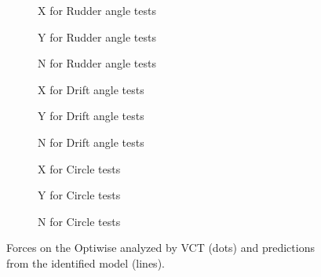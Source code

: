 \begin{figure}[h]
    \centering
    \begin{subfigure}[b]{0.325\textwidth}
         \centering
         
        \caption{X for Rudder angle tests}
        \label{fig:rudder_angle_X_optiwise}
    \end{subfigure}
    \hfill
    \begin{subfigure}[b]{0.325\textwidth}
        \centering
        
       \caption{Y for Rudder angle tests}
       \label{fig:rudder_angle_Y_optiwise}
    \end{subfigure}
    \hfill
    \begin{subfigure}[b]{0.325\textwidth}
        \centering
        
       \caption{N for Rudder angle tests}
       \label{fig:rudder_angle_N_optiwise}
    \end{subfigure}

    \vfill
    \begin{subfigure}[b]{0.325\textwidth}
        \centering
        
       \caption{X for Drift angle tests}
       \label{fig:drift_angle_X_optiwise}
    \end{subfigure}
    \hfill
    \begin{subfigure}[b]{0.325\textwidth}
        \centering
        
       \caption{Y for Drift angle tests}
       \label{fig:drift_angle_Y_optiwise}
    \end{subfigure}
    \hfill
    \begin{subfigure}[b]{0.325\textwidth}
        \centering
        
       \caption{N for Drift angle tests}
       \label{fig:drift_angle_N_optiwise}
    \end{subfigure}
    
    \vfill
    \begin{subfigure}[b]{0.325\textwidth}
        \centering
        
       \caption{X for Circle tests}
       \label{fig:circle_X_optiwise}
    \end{subfigure}
    \hfill
    \begin{subfigure}[b]{0.325\textwidth}
        \centering
        
       \caption{Y for Circle tests}
       \label{fig:circle_Y_optiwise}
    \end{subfigure}
    \hfill
    \begin{subfigure}[b]{0.325\textwidth}
        \centering
        
       \caption{N for Circle tests}
       \label{fig:circle_N_optiwise}
    \end{subfigure}
    
    \caption{Forces on the Optiwise analyzed by VCT (dots) and predictions from the identified model (lines).}
    \label{fig:VCT_optiwise}
\end{figure}
\FloatBarrier

